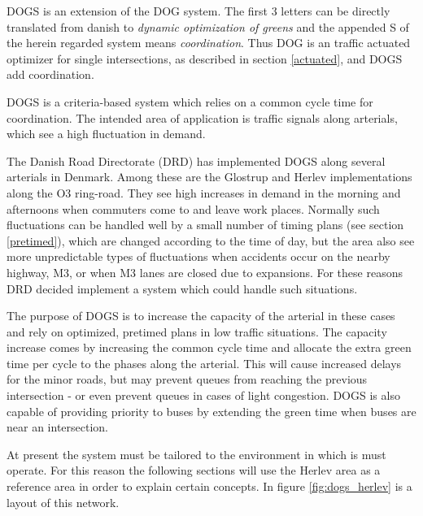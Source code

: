 DOGS is an extension of the DOG system. The first 3 letters can be directly translated from danish to \textit{dynamic optimization of greens} and the appended S of the herein regarded system means \textit{coordination}. Thus DOG is an traffic actuated optimizer for single intersections, as described in section \ref{actuated}, and DOGS add coordination.

DOGS is a criteria-based system which relies on a common cycle time for coordination. The intended area of application is traffic signals along arterials, which see a high fluctuation in demand. 

The Danish Road Directorate (DRD) has implemented DOGS along several arterials in Denmark. 
Among these are the Glostrup and Herlev implementations along the O3 ring-road. They see high increases in demand in the morning and afternoons when commuters come to and leave work places. Normally such fluctuations can be handled well by a small number of timing plans (see section \ref{pretimed}), which are changed according to the time of day, but the area also see more unpredictable types of fluctuations when accidents occur on the nearby highway, M3, or when M3 lanes are closed due to expansions. For these reasons DRD decided implement a system which could handle such situations.

The purpose of DOGS is to increase the capacity of the arterial in these cases and rely on optimized, pretimed plans in low traffic situations. The capacity increase comes by increasing the common cycle time and allocate the extra green time per cycle to the phases along the arterial. This will cause increased delays for the minor roads, but may prevent queues from reaching the previous intersection - or even prevent queues in cases of light congestion.
DOGS is also capable of providing priority to buses by extending the green time when buses are near an intersection.

At present the system must be tailored to the environment in which is must operate. For this reason the following sections will use the Herlev area as a reference area in order to explain certain concepts. In figure \ref{fig:dogs_herlev} is a layout of this network.

